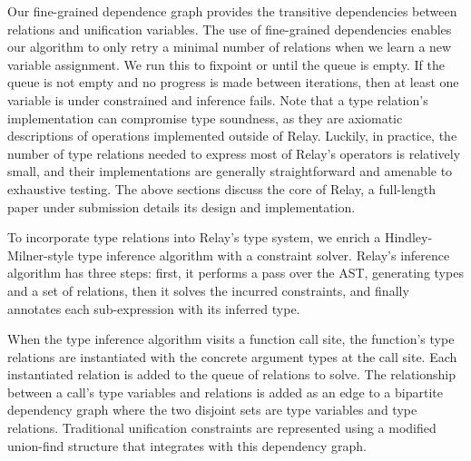 Our fine-grained dependence graph provides the transitive dependencies
between relations and unification variables.
The use of fine-grained dependencies enables our algorithm to
only retry a minimal number of relations when we
learn a new variable assignment.
We run this to fixpoint or until the queue is empty.
If the queue is not empty and no progress is made between iterations,
then at least one variable is under constrained and inference fails.
Note that a type relation's implementation can
compromise type soundness, as they are axiomatic descriptions
of operations implemented outside of Relay.
Luckily, in practice, the number of type relations needed to express most of Relay's
operators is relatively small, and their implementations are generally straightforward
and amenable to exhaustive testing.
The above sections discuss the core of Relay, a full-length paper under submission\citep{roesch2019relay}
details its design and implementation.

To incorporate type relations into Relay's type system, we enrich
a Hindley-Milner-style type inference algorithm with
a constraint solver.
Relay's inference algorithm has three steps: first, it
performs a pass over the AST, generating types and a set of relations,
then it solves the incurred constraints,
and finally annotates each sub-expression with its inferred type.


When the type inference algorithm visits a function call site, the function's type relations are
instantiated with the concrete argument types at the call site.
Each instantiated relation is added to the queue of relations to solve.
The relationship between a call's type variables and relations is added as an edge to
a bipartite dependency graph where the two disjoint sets are type variables and type relations.
Traditional unification constraints are represented using a modified union-find structure that
integrates with this dependency graph.

